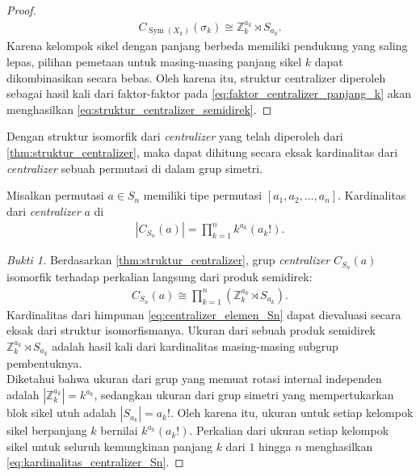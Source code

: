 \begin{proof}
  \begin{align}\label{eq:faktor_centralizer_panjang_k}
    C_{\operatorname{Sym}(X_k)}(\sigma_k) \cong \mathbb{Z}_k^{a_k}\rtimes S_{a_k}.
  \end{align}
  Karena kelompok sikel dengan panjang berbeda memiliki pendukung yang saling lepas, pilihan pemetaan untuk masing-masing panjang sikel $k$ dapat dikombinasikan secara bebas. Oleh karena itu, struktur centralizer diperoleh sebagai hasil kali dari faktor-faktor pada \eqref{eq:faktor_centralizer_panjang_k} akan menghasilkan \eqref{eq:struktur_centralizer_semidirek}.
\end{proof}

Dengan struktur isomorfik dari \emph{centralizer} yang telah diperoleh dari \autoref{thm:struktur_centralizer}, maka dapat dihitung secara eksak kardinalitas dari \emph{centralizer} sebuah permutasi di dalam grup simetri.

\begin{lema}\label{lem:kardinalitas_centralizer_Sn}
  Misalkan permutasi $a \in S_n$ memiliki tipe permutasi $[a_1, a_2, \ldots, a_n]$. Kardinalitas dari \emph{centralizer} $a$ di \begin{align}\label{eq:kardinalitas_centralizer_Sn}
    |C_{S_n}(a)| = \prod_{k=1}^{n} k^{a_k} (a_k!).
  \end{align}
\end{lema}

\begin{proof}[Bukti 1]
  Berdasarkan \autoref{thm:struktur_centralizer}, grup \emph{centralizer} $C_{S_n}(a)$ isomorfik terhadap perkalian langsung dari produk semidirek:
  \begin{align}\label{eq:centralizer_elemen_Sn}
    C_{S_n}(a) \cong \prod_{k=1}^{n} \left( \mathbb{Z}_k^{a_k} \rtimes S_{a_k} \right).
  \end{align}
  Kardinalitas dari himpunan \eqref{eq:centralizer_elemen_Sn} dapat dievaluasi secara eksak dari struktur isomorfismanya. Ukuran dari sebuah produk semidirek $\mathbb{Z}_k^{a_k} \rtimes S_{a_k}$ adalah hasil kali dari kardinalitas masing-masing subgrup pembentuknya.\\
  Diketahui bahwa ukuran dari grup yang memuat rotasi internal independen adalah $|\mathbb{Z}_k^{a_k}| = k^{a_k}$, sedangkan ukuran dari grup simetri yang mempertukarkan blok sikel utuh adalah $|S_{a_k}| = a_k!$. Oleh karena itu, ukuran untuk setiap kelompok sikel berpanjang $k$ bernilai $k^{a_k}(a_k!)$. Perkalian dari ukuran setiap kelompok sikel untuk seluruh kemungkinan panjang $k$ dari $1$ hingga $n$ menghasilkan \eqref{eq:kardinalitas_centralizer_Sn}.
\end{proof}

